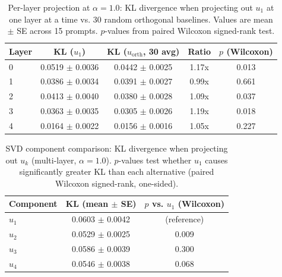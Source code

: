 \documentclass[11pt,a4paper]{article}
\theoremstyle{definition}
\theoremstyle{plain}
\begin{document}
\begin{table}[H]
\centering
\caption{Per-layer projection at $\alpha = 1.0$: KL divergence when projecting out $u_1$ at one layer at a time vs. 30 random orthogonal baselines. Values are mean $\pm$ SE across 15 prompts. $p$-values from paired Wilcoxon signed-rank test.}
\label{tab:per_layer_projection}
\begin{tabular}{lcccc}
\toprule
\textbf{Layer} & \textbf{KL ($u_1$)} & \textbf{KL ($u_{\text{orth}}$, 30 avg)} & \textbf{Ratio} & \textbf{$p$ (Wilcoxon)} \\
\midrule
0 & 0.0519 $\pm$ 0.0036 & 0.0442 $\pm$ 0.0025 & 1.17x & 0.013 \\
1 & 0.0386 $\pm$ 0.0034 & 0.0391 $\pm$ 0.0027 & 0.99x & 0.661 \\
2 & 0.0413 $\pm$ 0.0040 & 0.0380 $\pm$ 0.0028 & 1.09x & 0.037 \\
3 & 0.0363 $\pm$ 0.0035 & 0.0305 $\pm$ 0.0026 & 1.19x & 0.018 \\
4 & 0.0164 $\pm$ 0.0022 & 0.0156 $\pm$ 0.0016 & 1.05x & 0.227 \\
\bottomrule
\end{tabular}
\end{table}

\begin{table}[H]
\centering
\caption{SVD component comparison: KL divergence when projecting out $u_k$ (multi-layer, $\alpha = 1.0$). $p$-values test whether $u_1$ causes significantly greater KL than each alternative (paired Wilcoxon signed-rank, one-sided).}
\label{tab:svd_component_comparison}
\begin{tabular}{lcc}
\toprule
\textbf{Component} & \textbf{KL (mean $\pm$ SE)} & \textbf{$p$ vs. $u_1$ (Wilcoxon)} \\
\midrule
$u_1$ & 0.0603 $\pm$ 0.0042 & (reference) \\
$u_2$ & 0.0529 $\pm$ 0.0025 & 0.009 \\
$u_3$ & 0.0586 $\pm$ 0.0039 & 0.300 \\
$u_4$ & 0.0546 $\pm$ 0.0038 & 0.068 \\
\bottomrule
\end{tabular}
\end{table}
\end{document}
